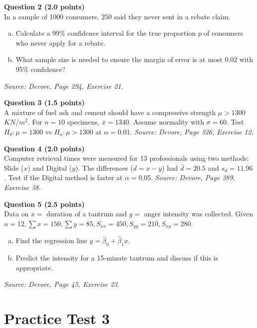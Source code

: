 \documentclass[11pt,a4paper]{article}
\begin{document}
\vspace{1em}
\noindent \textbf{Question 2 (2.0 points)} \\
In a sample of 1000 consumers, 250 said they never sent in a rebate claim.
\begin{enumerate}[(a)]
    \item Calculate a 99\% confidence interval for the true proportion $p$ of consumers who never apply for a rebate.
    \item What sample size is needed to ensure the margin of error is at most $0.02$ with 95\% confidence?
\end{enumerate}
\textit{Source: Devore, Page 294, Exercise 21.}

\vspace{1em}
\noindent \textbf{Question 3 (1.5 points)} \\
A mixture of fuel ash and cement should have a compressive strength $\mu > 1300$ $KN/m^2$. For $n=10$ specimens, $\bar{x} = 1340$. Assume normality with $\sigma = 60$. Test $H_0: \mu = 1300$ vs $H_a: \mu > 1300$ at $\alpha = 0.01$.
\textit{Source: Devore, Page 326, Exercise 12.}

\vspace{1em}
\noindent \textbf{Question 4 (2.0 points)} \\
Computer retrieval times were measured for 13 professionals using two methods: Slide ($x$) and Digital ($y$). The differences ($d = x - y$) had $\bar{d} = 20.5$ and $s_d = 11.96$. Test if the Digital method is faster at $\alpha = 0.05$.
\textit{Source: Devore, Page 389, Exercise 38.}

\vspace{1em}
\noindent \textbf{Question 5 (2.5 points)} \\
Data on $x = $ duration of a tantrum and $y = $ anger intensity was collected. Given $n=12, \sum x = 150, \sum y = 85, S_{xx} = 450, S_{yy} = 210, S_{xy} = 280$.
\begin{enumerate}[(a)]
    \item Find the regression line $y = \hat{\beta}_0 + \hat{\beta}_1 x$.
    \item Predict the intensity for a 15-minute tantrum and discuss if this is appropriate.
\end{enumerate}
\textit{Source: Devore, Page 45, Exercise 23.}

\newpage

\section*{Practice Test 3}
\end{document}
